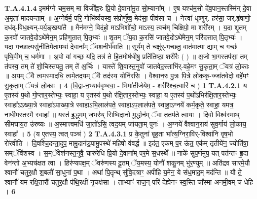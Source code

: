 \documentclass[17pt]{extarticle}
\begin{document}
                  \newline
                                                                  \textbf{ T.A.4.1.4} \newline
                  इ॒मम॑ग्ने चम॒सम् मा विजी᳚ह्वरः प्रि॒यो दे॒वाना॑मु॒त सो॒म्याना᳚म् । ए॒ष यश्च॑म॒सो दे॑व॒पान॒स्तस्मि॑न् दे॒वा अ॒मृता॑ मादयन्ताम् ॥  अ॒ग्नेर्वर्म॒ परि॒ गोभि॑र्व्ययस्व॒ संप्रोर्णु॑ष्व॒ मेद॑सा॒ पीव॑सा च । नेत्त्वा॑ धृ॒ष्णुर्. हर॑सा॒ जर्.हृ॑षाणो॒ दध॑द्-विध॒क्ष्यन्-पर्य॒ङ्खया॑तै ॥  मैन॑मग्ने॒ विद॑हो॒ माऽभिशो॑चो॒ माऽस्य॒ त्वच॑म् चिक्षिपो॒ मा शरी॑रम् । य॒दा शृ॒तम् क॒रवो॑ जातवे॒दोऽथे॑मेन॒म् प्रहि॑णुतात् पि॒तृभ्यः॑ ॥  शृ॒तम् ॅय॒दा क॒रसि॑ जातवे॒दोऽथे॑मेन॒म् परि॑दत्तात् पि॒तृभ्यः॑ । य॒दा गच्छा॒त्यसु॑नीतिमे॒तामथा॑ दे॒वाना᳚म् ॅवश॒नीर्भ॑वाति ॥ सूर्य॑म् ते॒ चक्षु॑र्-गच्छतु॒ वात॑मा॒त्मा द्याम् च॒ गच्छ॑ पृथि॒वीम् च॒ धर्म॑णा ।  अ॒पो वा॑ गच्छ॒ यदि॒ तत्र॑ ते हि॒तमोष॑धीषु॒ प्रति॑तिष्ठा॒ शरी॑रैः ( ) ॥ अ॒जो भा॒गस्तप॑सा॒ तम् त॑पस्व॒ तम् ते॑ शो॒चिस्त॑पतु॒ तम् ते॑ अ॒र्चिः ।  यास्ते॑ शि॒वास्त॒नुवो॑ जातवेद॒स्ताभि॑र्-वहे॒मꣳ सु॒कृता॒म् ॅयत्र॑ लो॒काः ॥ अ॒यम् ॅवै त्वम॒स्मादधि॒ त्वमे॒तद॒यम् ॅवै तद॑स्य॒ योनि॑रसि । वै॒श्वा॒न॒रः पु॒त्रः पि॒त्रे लो॑क॒कृ-ज्जा॑तवेदो॒ वहे॑मꣳ सु॒कृता॒म् ॅयत्र॑ लो॒काः । \textbf{ 4} \newline
                  \newline
                                                        (वि॒द्वा-न॒भ्याव॑वृथ्स्वा॒ - भिमा॑तीर्जयेम॒ - शरी᳚रैश्च॒त्वारि॑ च ) \textbf{1} \newline \newline
                                \textbf{ T.A.4.2.1} \newline
                  य ए॒तस्य॑ प॒थो गो॒प्तार॒स्तेभ्यः॒ स्वाहा॒ य ए॒तस्य॑ प॒थो र॑क्षि॒तार॒स्तेभ्यः॒ स्वाहा॒ य ए॒तस्य॑ प॒थो॑ऽभिर॑क्षि॒तार॒स्तेभ्यः॒ स्वाहा᳚ऽऽख्या॒त्रे स्वाहा॑ऽपाख्या॒त्रे स्वाहा॑ऽभि॒लाल॑पते॒ स्वाहा॑ऽप॒लाल॑पते॒ स्वाहा॒ऽग्नये॑ कर्म॒कृते॒ स्वाहा॒ यमत्र॒ नाधी॒मस्तस्मै॒ स्वाहा᳚ ॥  यस्त॑ इ॒द्ध्मम् ज॒भर॑थ् सिष्विदा॒नो मू॒र्द्धान॑म् ॅवा त॒तप॑ते त्वा॒या । दिवो॒ विश्व॑स्माथ् सीमघाय॒त उ॑रुष्यः ॥ अ॒स्मात्त्वमधि॑ जा॒तो॑ऽसि॒ त्वद॒यम् जा॑यता॒म् पुनः॑ । अ॒ग्नये॑ वैश्वान॒राय॑ सुव॒र्गाय॑ लो॒काय॒ स्वाहा᳚ । \textbf{ 5} \newline
                  \newline
                                                        (य ए॒तस्य॒ त्वत् पञ्च॑ ) \textbf{2} \newline \newline
                                \textbf{ T.A.4.3.1} \newline
                  प्र के॒तुना॑ बृह॒ता भा᳚त्य॒ग्निरा॒विर्-विश्वा॑नि वृष॒भो रो॑रवीति । दि॒वश्चि॒दन्ता॒दुप॒ मामु॒दान॑ड॒पामु॒पस्थे॑ महि॒षो व॑वर्द्ध ॥  इ॒दंत॒ एक॑म् प॒र ऊ॑त॒ एक॑म् तृ॒तीये॑न॒ ज्योति॑षा॒ सम्ॅवि॑शस्व । स॒म्ॅवेश॑नस्त॒नुवै॒ चारु॑रेधि प्रि॒यो दे॒वाना᳚म् पर॒मे स॒धस्थे᳚ ॥  नाके॑ सुप॒र्णमुप॒ यत् पत॑न्तꣳ हृ॒दा वेन॑न्तो अ॒भ्यच॑क्षत त्वा । हिर॑ण्यपक्ष॒म् ॅवरु॑णस्य दू॒तम् ॅय॒मस्य॒ योनौ॑ शकु॒नम् भु॑र॒ण्युम् ॥  अति॑द्रव सारमे॒यौ श्वानौ॑ चतुर॒क्षौ श॒बलौ॑ सा॒धुना॑ प॒था । अथा॑ पि॒तॄन्थ् सु॑वि॒दत्राꣳ॒॒ अपी॑हि य॒मेन॒ ये स॑ध॒माद॒म् मद॑न्ति ॥  यौ ते॒ श्वानौ॑ यम रक्षि॒तारौ॑ चतुर॒क्षौ प॑थि॒रक्षी॑ नृ॒चक्ष॑सा ।  ताभ्याꣳ॑ राज॒न् परि॑ देह्येनꣳ स्व॒स्ति चा᳚स्मा अनमी॒वम् च॑ धेहि । \textbf{ 6} \newline
\end{document}
